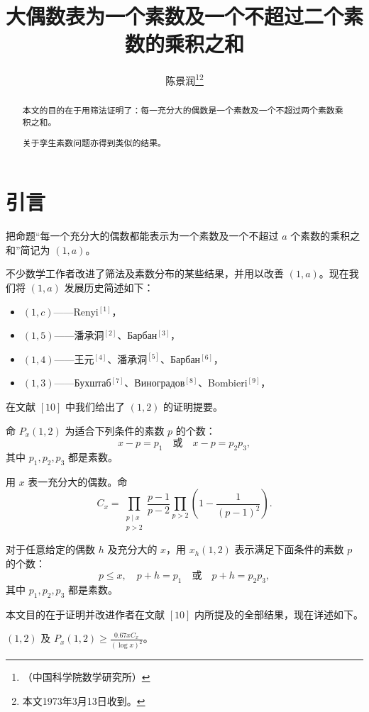 \title{大偶数表为一个素数及一个不超过二个素数的乘积之和}
\author{陈景润\thanks{（中国科学院数学研究所）}\thanks{本文1973年3月13日收到。}}
\date{}
\maketitle

\begin{abstract}
本文的目的在于用筛法证明了：每一充分大的偶数是一个素数及一个不超过两个素数乘积之和。

关于孪生素数问题亦得到类似的结果。
\end{abstract}

\section{引言}

把命题“每一个充分大的偶数都能表示为一个素数及一个不超过 $a$ 个素数的乘积之和”简记为 $(1,a)$。

不少数学工作者改进了筛法及素数分布的某些结果，并用以改善 $(1,a)$。现在我们将 $(1,a)$ 发展历史简述如下：

\begin{itemize}[leftmargin=2em]
\item $(1,c)$——Renyi$^{[1]}$，
\item $(1,5)$——潘承洞$^{[2]}$、{\cyrfont Барбан}$^{[3]}$，
\item $(1,4)$——王元$^{[4]}$、潘承洞$^{[5]}$、{\cyrfont Барбан}$^{[6]}$，
\item $(1,3)$——{\cyrfont Бухштаб}$^{[7]}$、{\cyrfont Виноградов}$^{[8]}$、Bombieri$^{[9]}$，
\end{itemize}
在文献 $[10]$ 中我们给出了 $(1,2)$ 的证明提要。

命 $P_x(1,2)$ 为适合下列条件的素数 $p$ 的个数：
\[
x-p=p_1 \quad \text{或} \quad x-p=p_2p_3,
\]
其中 $p_1,p_2,p_3$ 都是素数。

用 $x$ 表一充分大的偶数。命
\[
C_x=\prod_{\substack{p\mid x\\ p>2}}\frac{p-1}{p-2}\prod_{p>2}\left(1-\frac{1}{(p-1)^2}\right).
\]

对于任意给定的偶数 $h$ 及充分大的 $x$，用 $x_h(1,2)$ 表示满足下面条件的素数 $p$ 的个数：
\[
p\leqslant x,\quad p+h=p_1 \quad \text{或} \quad p+h=p_2p_3,
\]
其中 $p_1,p_2,p_3$ 都是素数。

本文目的在于证明并改进作者在文献 $[10]$ 内所提及的全部结果，现在详述如下。

\begin{theorem}
$(1,2)$ 及 $\displaystyle P_x(1,2)\geqslant\frac{0.67xC_x}{(\log x)^2}$。
\end{theorem}


